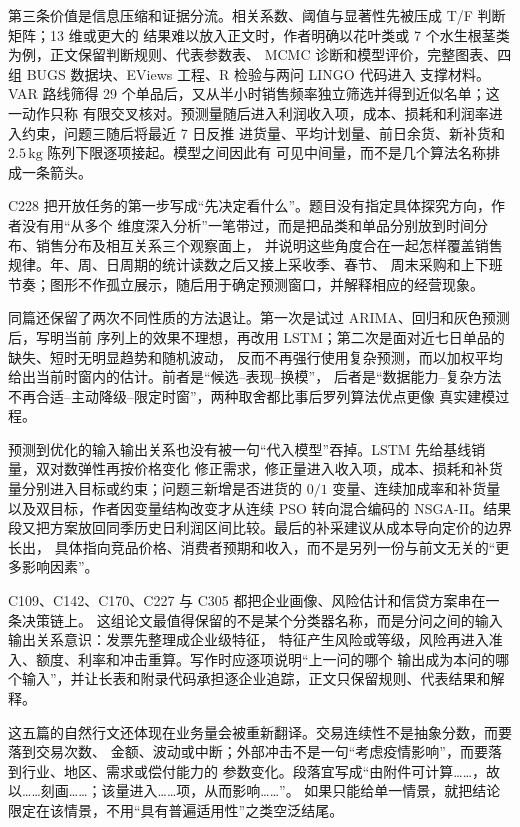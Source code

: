 第三条价值是信息压缩和证据分流。相关系数、阈值与显著性先被压成 T/F 判断矩阵；13 维或更大的
结果难以放入正文时，作者明确以花叶类或 7 个水生根茎类为例，正文保留判断规则、代表参数表、
MCMC 诊断和模型评价，完整图表、四组 BUGS 数据块、EViews 工程、R 检验与两问 LINGO 代码进入
支撑材料。VAR 路线筛得 29 个单品后，又从半小时销售频率独立筛选并得到近似名单；这一动作只称
有限交叉核对。预测量随后进入利润收入项，成本、损耗和利润率进入约束，问题三随后将最近 7 日反推
进货量、平均计划量、前日余货、新补货和 $2.5\,\mathrm{kg}$ 陈列下限逐项接起。模型之间因此有
可见中间量，而不是几个算法名称排成一条箭头。

C228 把开放任务的第一步写成“先决定看什么”。题目没有指定具体探究方向，作者没有用“从多个
维度深入分析”一笔带过，而是把品类和单品分别放到时间分布、销售分布及相互关系三个观察面上，
并说明这些角度合在一起怎样覆盖销售规律。年、周、日周期的统计读数之后又接上采收季、春节、
周末采购和上下班节奏；图形不作孤立展示，随后用于确定预测窗口，并解释相应的经营现象。

同篇还保留了两次不同性质的方法退让。第一次是试过 ARIMA、回归和灰色预测后，写明当前
序列上的效果不理想，再改用 LSTM；第二次是面对近七日单品的缺失、短时无明显趋势和随机波动，
反而不再强行使用复杂预测，而以加权平均给出当前时窗内的估计。前者是“候选--表现--换模”，
后者是“数据能力--复杂方法不再合适--主动降级--限定时窗”，两种取舍都比事后罗列算法优点更像
真实建模过程。

预测到优化的输入输出关系也没有被一句“代入模型”吞掉。LSTM 先给基线销量，双对数弹性再按价格变化
修正需求，修正量进入收入项，成本、损耗和补货量分别进入目标或约束；问题三新增是否进货的
$0/1$ 变量、连续加成率和补货量以及双目标，作者因变量结构改变才从连续 PSO 转向混合编码的
NSGA-II。结果段又把方案放回同季历史日利润区间比较。最后的补采建议从成本导向定价的边界长出，
具体指向竞品价格、消费者预期和收入，而不是另列一份与前文无关的“更多影响因素”。

C109、C142、C170、C227 与 C305 都把企业画像、风险估计和信贷方案串在一条决策链上。
这组论文最值得保留的不是某个分类器名称，而是分问之间的输入输出关系意识：发票先整理成企业级特征，
特征产生风险或等级，风险再进入准入、额度、利率和冲击重算。写作时应逐项说明“上一问的哪个
输出成为本问的哪个输入”，并让长表和附录代码承担逐企业追踪，正文只保留规则、代表结果和解释。

这五篇的自然行文还体现在业务量会被重新翻译。交易连续性不是抽象分数，而要落到交易次数、
金额、波动或中断；外部冲击不是一句“考虑疫情影响”，而要落到行业、地区、需求或偿付能力的
参数变化。段落宜写成“由附件可计算……，故以……刻画……；该量进入……项，从而影响……”。
如果只能给单一情景，就把结论限定在该情景，不用“具有普遍适用性”之类空泛结尾。

